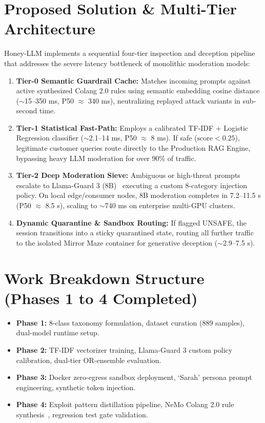 \documentclass[12pt,a4paper,oneside]{report}
\begin{document}
\section{Proposed Solution \& Multi-Tier Architecture}
Honey-LLM implements a sequential four-tier inspection and deception pipeline that addresses the severe latency bottleneck of monolithic moderation models:
\begin{enumerate}
    \item \textbf{Tier-0 Semantic Guardrail Cache:} Matches incoming prompts against active synthesized Colang 2.0 rules using semantic embedding cosine distance ($\sim$15--350 ms, P50 $\approx$ 340 ms), neutralizing replayed attack variants in sub-second time.
    \item \textbf{Tier-1 Statistical Fast-Path:} Employs a calibrated TF-IDF + Logistic Regression classifier ($\sim$2.1--14 ms, P50 $\approx$ 8 ms). If safe ($\text{score} < 0.25$), legitimate customer queries route directly to the Production RAG Engine, bypassing heavy LLM moderation for over 90\% of traffic.
    \item \textbf{Tier-2 Deep Moderation Sieve:} Ambiguous or high-threat prompts escalate to Llama-Guard 3 (8B)~\cite{llamaguard3} executing a custom 8-category injection policy. On local edge/consumer nodes, 8B moderation completes in 7.2--11.5 s (P50 $\approx$ 8.5 s), scaling to $\sim$740 ms on enterprise multi-GPU clusters.
    \item \textbf{Dynamic Quarantine \& Sandbox Routing:} If flagged UNSAFE, the session transitions into a sticky quarantined state, routing all further traffic to the isolated Mirror Maze container for generative deception ($\sim$2.9--7.5 s).
\end{enumerate}

\section{Work Breakdown Structure (Phases 1 to 4 Completed)}
\begin{itemize}
    \item \textbf{Phase 1:} 8-class taxonomy formulation, dataset curation (889 samples), dual-model runtime setup.
    \item \textbf{Phase 2:} TF-IDF vectorizer training, Llama-Guard 3 custom policy calibration, dual-tier OR-ensemble evaluation.
    \item \textbf{Phase 3:} Docker zero-egress sandbox deployment, `Sarah' persona prompt engineering, synthetic token injection.
    \item \textbf{Phase 4:} Exploit pattern distillation pipeline, NeMo Colang 2.0 rule synthesis~\cite{nemo2024guardrails}, regression test gate validation.
\end{itemize}
\end{document}
